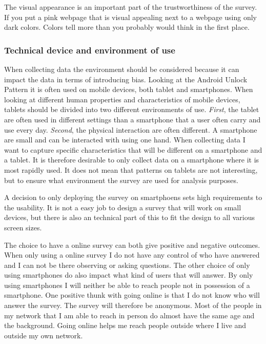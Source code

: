       The visual appearance is an important part of the trustworthiness of the survey. If you put a pink webpage that is visual appealing next to a webpage using only dark colors. Colors tell more than you probably would think in the first place.


    \subsubsection*{Technical device and environment of use}
      When collecting data the environment should be considered because it can impact the data in terms of introducing bias. Looking at the Android Unlock Pattern it is often used on mobile devices, both tablet and smartphones. When looking at different human properties and characteristics of mobile devices, tablets should be divided into two different environments of use. {\it First}, the tablet are often used in different settings than a smartphone that a user often carry and use every day. {\it Second}, the physical interaction are often different. A smartphone are small and can be interacted with using one hand. When collecting data I want to capture specific characteristics that will be different on a smartphone and a tablet. It is therefore desirable to only collect data on a smartphone where it is most rapidly used. It does not mean that patterns on tablets are not interesting, but to ensure what environment the survey are used for analysis purposes. 

      A decision to only deploying the survey on smartphoens sets high requirements to the usability. It is not a easy job to design a survey that will work on small devices, but there is also an technical part of this to fit the design to all various screen sizes. 

      The choice to have a online survey can both give positive and negative outcomes. When only using a online survey I do not have any control of who have answered and I can not be there observing or asking questions. The other choice of only using smartphones do also impact what kind of users that will answer. By only using smartphones I will neither be able to reach people not in possession of a smartphone. One positive thunk with going online is that I do not know who will answer the survey. The survey will therefore be anonymous. Most of the people in my network that I am able to reach in person do almost have the same age and the background. Going online helps me reach people outside where I live and outside my own network.

